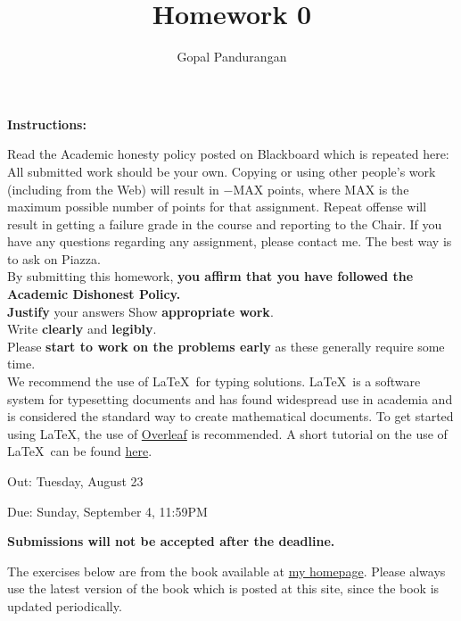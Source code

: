 \documentclass[final]{article}
\date{}
\title{Homework 0}
\author{Gopal Pandurangan}
\begin{document}
\maketitle

\begin{tcolorbox}
    \noindent\textbf{Instructions:}

    Read the Academic honesty policy posted on Blackboard which is repeated here:
    All submitted work should be  your own. Copying or using other people's work (including  from the Web) will result in $-\text{MAX}$ points,
    where $\text{MAX}$ is the maximum possible number of points for that assignment. Repeat offense will result in getting a failure grade in
    the course and reporting to the Chair. If you have any questions regarding any assignment, please contact me. The best way is to ask on Piazza.\\

    By submitting this homework, \textbf{you affirm that you have followed the Academic Dishonest Policy.}\\

    \textbf{Justify} your answers Show \textbf{appropriate work}.\\

    Write \textbf{clearly} and \textbf{legibly}.\\

    Please \textbf{start to work on the problems early} as these generally require some time.\\

    We recommend the use of \LaTeX\ for typing solutions. \LaTeX\  is a software system for typesetting documents and has found widespread use
    in academia and is considered the standard way to create mathematical documents. To get started using \LaTeX, the use of
    \href{https://www.overleaf.com}{Overleaf} is recommended. A short tutorial on the use of \LaTeX\ can be found
    \href{https://www.overleaf.com/learn/latex/Learn_LaTeX_in_30_minutes}{here}.\\

    \begin{tcolorbox}[colback=red!5!white,colframe=red!75!black]
        Out: Tuesday, August 23

        Due: Sunday, September 4, 11:59PM

        \textbf{Submissions will not be accepted after the deadline.}
    \end{tcolorbox}

    The exercises below are from the book available at \href{https://sites.google.com/site/gopalpandurangan/home/algorithms-course}{my homepage}.
    Please always use the latest version of the book which is posted at this site, since the book is updated periodically.


\end{tcolorbox}
\end{document}
